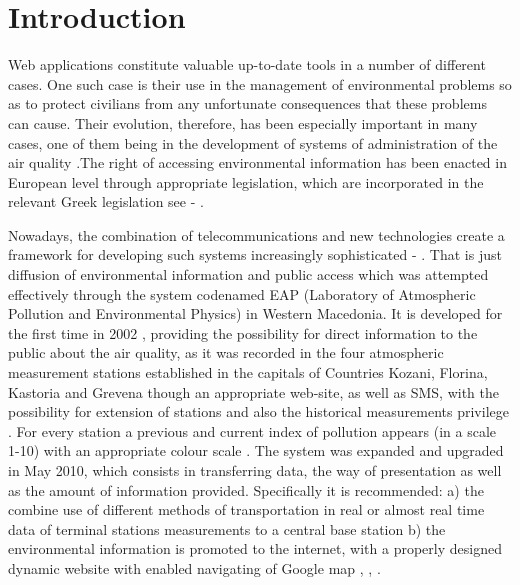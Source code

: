 \documentclass[conference]{IEEEtran}
\begin{document}
\IEEEpeerreviewmaketitle



\section{Introduction}
Web applications constitute valuable up-to-date tools in a number of different cases. One such case is their use in the management of environmental problems so as to protect civilians from any unfortunate consequences that these problems can cause. Their evolution, therefore, has been especially important in many cases, one of them being in the development of systems of administration of the air quality \cite{Triant2004}.The right of accessing  environmental information has been  enacted in European level through appropriate legislation, which are incorporated in the relevant Greek legislation see \cite {Council1}- \cite {Council5}.


Nowadays, the combination of telecommunications and new technologies create a framework for developing such systems increasingly sophisticated \cite {Karatzas}- \cite {Triant_book} . That is just diffusion of environmental information and public access which was attempted effectively through the system codenamed EAP (Laboratory of Atmospheric Pollution and Environmental Physics) in Western Macedonia. It is  developed for the first time in 2002  \cite {anakoinosi}, providing the possibility for direct information to the public about the air quality, as it was recorded in the four atmospheric measurement stations established in the capitals of Countries Kozani, Florina, Kastoria and Grevena though an appropriate web-site, as well as SMS, with the possibility for extension of stations and also the historical measurements privilege \cite {triantEvazoras2006}. For every station a previous and current index of pollution appears (in a scale 1-10) with an appropriate colour scale \cite {Comeap}.
The system was expanded and upgraded in May 2010, which consists in transferring data, the way of presentation as well as the amount of information provided. Specifically it is recommended: a) the combine use of different methods of transportation in real or almost real time data of terminal stations measurements to a central base station b) the environmental information is promoted to the internet, with a properly designed dynamic website with enabled navigating of Google map  \cite {TriantSkordas}, \cite {Skordas_Fragulis_Triant2011}, \cite {airlab}.
\end{document}
